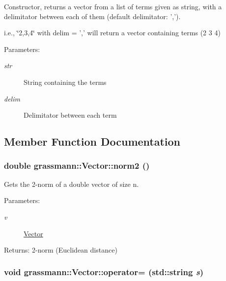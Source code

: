 Constructor, returns a vector from a list of terms given as string, with a delimitator between each of them (default delimitator: ','). 

i.e., \char`\"{}2,3,4\char`\"{} with delim = ',' will return a vector containing terms (2 3 4) \begin{Desc}
\item[Parameters:]
\begin{description}
\item[{\em str}]String containing the terms \item[{\em delim}]Delimitator between each term \end{description}
\end{Desc}


\subsection{Member Function Documentation}
\hypertarget{classgrassmann_1_1Vector_1c53c0f4829396b3db7aa4096d37d605}{
\subsubsection[norm2]{\setlength{\rightskip}{0pt plus 5cm}double grassmann::Vector::norm2 ()}}
\label{classgrassmann_1_1Vector_1c53c0f4829396b3db7aa4096d37d605}


Gets the 2-norm of a double vector of size n. 

\begin{Desc}
\item[Parameters:]
\begin{description}
\item[{\em v}]\hyperlink{classgrassmann_1_1Vector}{Vector} \end{description}
\end{Desc}
\begin{Desc}
\item[Returns:]2-norm (Euclidean distance) \end{Desc}
\hypertarget{classgrassmann_1_1Vector_838a1376ed8e8d5bcb63ae71258711a4}{
\subsubsection[operator=]{\setlength{\rightskip}{0pt plus 5cm}void grassmann::Vector::operator= (std::string {\em s})}}
\label{classgrassmann_1_1Vector_838a1376ed8e8d5bcb63ae71258711a4}


